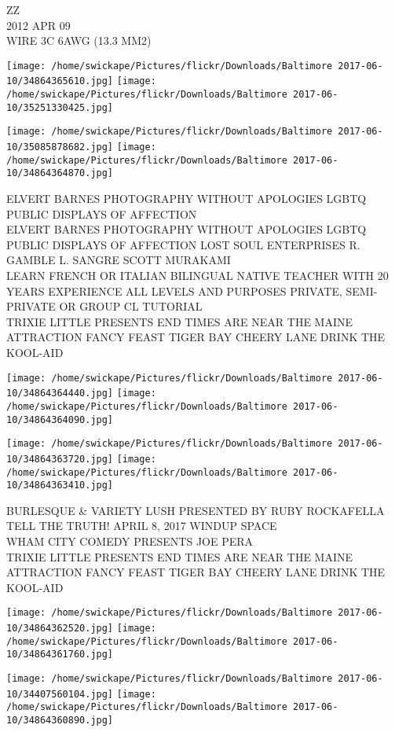 \documentclass[10pt,letterpaper]{article}
\begin{document}
ZZ\\
2012 APR 09\\
WIRE 3C 6AWG (13.3 MM2)
\pagebreak

\texttt{[image: /home/swickape/Pictures/flickr/Downloads/Baltimore 2017-06-10/34864365610.jpg]}
\texttt{[image: /home/swickape/Pictures/flickr/Downloads/Baltimore 2017-06-10/35251330425.jpg]}

\texttt{[image: /home/swickape/Pictures/flickr/Downloads/Baltimore 2017-06-10/35085878682.jpg]}
\texttt{[image: /home/swickape/Pictures/flickr/Downloads/Baltimore 2017-06-10/34864364870.jpg]}

ELVERT BARNES PHOTOGRAPHY WITHOUT APOLOGIES LGBTQ PUBLIC DISPLAYS OF AFFECTION\\
ELVERT BARNES PHOTOGRAPHY WITHOUT APOLOGIES LGBTQ PUBLIC DISPLAYS OF AFFECTION LOST SOUL ENTERPRISES R. GAMBLE L. SANGRE SCOTT MURAKAMI\\
LEARN FRENCH OR ITALIAN BILINGUAL NATIVE TEACHER WITH 20 YEARS EXPERIENCE ALL LEVELS AND PURPOSES PRIVATE, SEMI{-}PRIVATE OR GROUP CL TUTORIAL\\
TRIXIE LITTLE PRESENTS END TIMES ARE NEAR THE MAINE ATTRACTION FANCY FEAST TIGER BAY CHEERY LANE DRINK THE KOOL{-}AID
\pagebreak

\texttt{[image: /home/swickape/Pictures/flickr/Downloads/Baltimore 2017-06-10/34864364440.jpg]}
\texttt{[image: /home/swickape/Pictures/flickr/Downloads/Baltimore 2017-06-10/34864364090.jpg]}

\texttt{[image: /home/swickape/Pictures/flickr/Downloads/Baltimore 2017-06-10/34864363720.jpg]}
\texttt{[image: /home/swickape/Pictures/flickr/Downloads/Baltimore 2017-06-10/34864363410.jpg]}

BURLESQUE \& VARIETY LUSH PRESENTED BY RUBY ROCKAFELLA\\
TELL THE TRUTH! APRIL 8, 2017 WINDUP SPACE\\
WHAM CITY COMEDY PRESENTS JOE PERA\\
TRIXIE LITTLE PRESENTS END TIMES ARE NEAR THE MAINE ATTRACTION FANCY FEAST TIGER BAY CHEERY LANE DRINK THE KOOL{-}AID
\pagebreak

\texttt{[image: /home/swickape/Pictures/flickr/Downloads/Baltimore 2017-06-10/34864362520.jpg]}
\texttt{[image: /home/swickape/Pictures/flickr/Downloads/Baltimore 2017-06-10/34864361760.jpg]}

\texttt{[image: /home/swickape/Pictures/flickr/Downloads/Baltimore 2017-06-10/34407560104.jpg]}
\texttt{[image: /home/swickape/Pictures/flickr/Downloads/Baltimore 2017-06-10/34864360890.jpg]}
\end{document}
